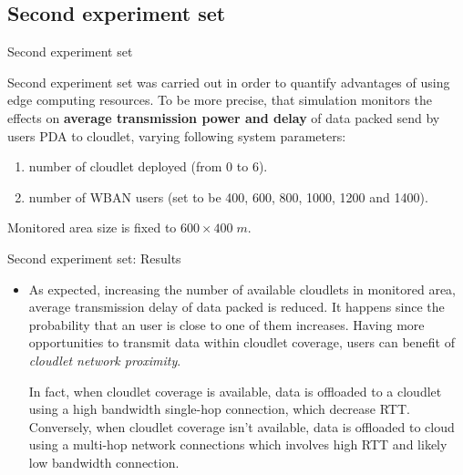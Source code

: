 \documentclass[10pt]{beamer}
\begin{document}
\subsection{Second experiment set}
\begin{frame}{Second experiment set} 

Second experiment set was carried out in order to quantify advantages of using edge computing resources. To be more precise, that simulation monitors the effects on \textbf{average transmission power and delay} of data packed send by users PDA to cloudlet, varying following system parameters:

\begin{enumerate}
\item number of cloudlet deployed (from 0 to 6).
\item number of WBAN users (set to be 400, 600, 800, 1000, 1200 and 1400).
\end{enumerate}

Monitored area size is fixed to $600 \times 400\;m$.

\end{frame} 
\begin{frame}{Second experiment set: Results}  

\begin{itemize}

\item As expected, increasing the number of available cloudlets in monitored area, average transmission delay of data packed is reduced. It happens since the probability  that an user is close to one of them increases. Having more opportunities to transmit data within cloudlet coverage, users can benefit of \textit{cloudlet network proximity}. 

In fact, when cloudlet coverage is available, data is offloaded to a cloudlet using a high bandwidth single-hop connection, which decrease RTT. Conversely, when cloudlet coverage isn't available, data is offloaded to cloud using a multi-hop network connections which involves high RTT and likely low bandwidth connection.\cite{ArchitecturalTacticsCyberForaging}

\end{itemize}

\end{frame} 
\end{document}
